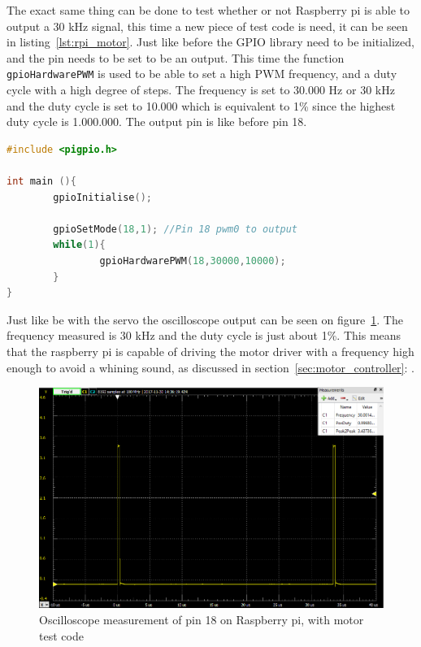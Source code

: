 The exact same thing can be done to test whether or not Raspberry pi is able to output a 30 kHz signal, this time a new piece of test code is need, it can be seen in listing~\ref{lst:rpi_motor}. Just like before the GPIO library need to be initialized, and the pin needs to be set to be an output. This time the function \texttt{gpioHardwarePWM} is used to be able to set a high PWM frequency, and a duty cycle with a high degree of steps. The frequency is set to 30.000 Hz or 30 kHz and the duty cycle is set to 10.000 which is equivalent to 1\% since the highest duty cycle is 1.000.000. The output pin is like before pin 18.

\begin{lstlisting}[caption = {Test code to make the Raspberry pi run a motor a 30kHz}, captionpos=b, label={lst:rpi_motor}, 
language=C++,firstnumber=1]
#include <pigpio.h>

int main (){
        gpioInitialise();

        gpioSetMode(18,1); //Pin 18 pwm0 to output
        while(1){
                gpioHardwarePWM(18,30000,10000);
        }
}
\end{lstlisting}

Just like be with the servo the oscilloscope output can be seen on figure~\ref{fig:rpi_motor_pwm}. The frequency measured is 30 kHz and the duty cycle is just about 1\%. This means that the raspberry pi is capable of driving the motor driver with a frequency high enough to avoid a whining sound, as discussed in section~\ref{sec:motor_controller}: .

\begin{figure}[H]
\centering
\includegraphics[width=0.7\linewidth]{Images/Implementation/RPI_motor_PWM}
\caption{Oscilloscope measurement of pin 18 on Raspberry pi, with motor test code}
\label{fig:rpi_motor_pwm}
\end{figure}


